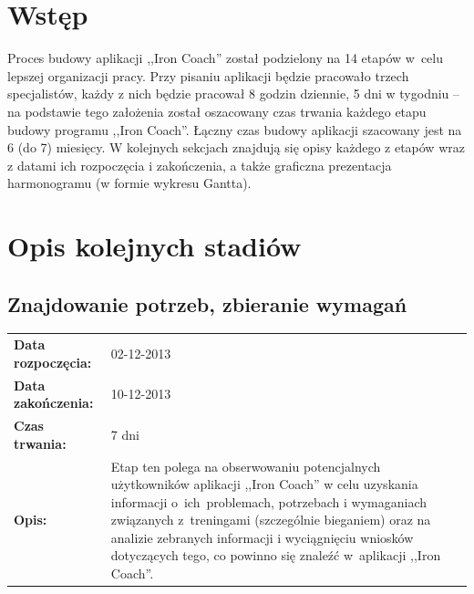 

\tableofcontents
\clearpage
\newcommand{\tabb}{\begin{tabular}{l p{8cm}}}
\renewcommand{\subsectionmark}[1]{}
\section{Wstęp}
\noindent
Proces budowy aplikacji ,,Iron Coach'' został podzielony na 14 etapów w~celu lepszej organizacji pracy. Przy pisaniu aplikacji będzie pracowało trzech specjalistów, każdy z nich będzie pracował 8 godzin dziennie, 5 dni w tygodniu -- na podstawie tego założenia został oszacowany czas trwania każdego etapu budowy programu ,,Iron Coach''. Łączny czas budowy aplikacji szacowany jest na 6 (do 7) miesięcy.
	W kolejnych sekcjach znajdują się opisy każdego z etapów wraz z datami ich rozpoczęcia i zakończenia, a także graficzna prezentacja harmonogramu (w formie wykresu Gantta).
\section{Opis kolejnych stadiów}
\subsection{Znajdowanie potrzeb, zbieranie wymagań}
	\tabb
		\textbf{Data rozpoczęcia:} & 02-12-2013\\
		\textbf{Data zakończenia:} & 10-12-2013\\
		\textbf{Czas trwania:} & 7 dni\\
		\textbf{Opis:} & Etap ten polega na obserwowaniu potencjalnych użytkowników aplikacji ,,Iron Coach'' w celu uzyskania informacji o~ich~problemach, potrzebach i wymaganiach związanych z~treningami (szczególnie bieganiem) oraz na analizie zebranych informacji i wyciągnięciu wniosków dotyczących tego, co powinno się znaleźć w~aplikacji ,,Iron Coach''.
	\end{tabular}
